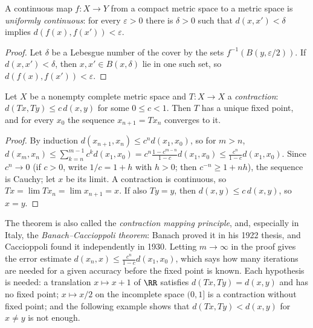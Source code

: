 \begin{corollary}\label{general-topology:corollary-uniform-continuity}
A continuous map $f \colon X \to Y$ from a compact metric space to a metric space is \emph{uniformly continuous}: for every $\varepsilon > 0$ there is
$\delta > 0$ such that $d(x, x') < \delta$ implies $d(f(x), f(x')) < \varepsilon$.
\end{corollary}

\begin{proof}
Let $\delta$ be a Lebesgue number of the cover by the sets $f^{-1}(B(y, \varepsilon/2))$. If $d(x, x') < \delta$, then $x, x' \in B(x, \delta)$ lie in one such
set, so $d(f(x), f(x')) < \varepsilon$.
\end{proof}

\begin{theorem}\label{general-topology:theorem-banach-fixed-point}
Let $X$ be a nonempty complete metric space and $T \colon X \to X$ a \emph{contraction}: $d(Tx, Ty) \leq c\,d(x, y)$ for some $0 \leq c < 1$. Then $T$ has a
unique fixed point, and for every $x_0$ the sequence $x_{n+1} = Tx_n$ converges to it.
\end{theorem}

\begin{proof}
By induction $d(x_{n+1}, x_n) \leq c^n d(x_1, x_0)$, so for $m > n$,
$d(x_m, x_n) \leq \sum_{k=n}^{m-1} c^k d(x_1, x_0) = c^n\frac{1 - c^{m-n}}{1 - c}d(x_1, x_0) \leq \frac{c^n}{1 - c}d(x_1, x_0)$. Since $c^n \to 0$ (if
$c > 0$, write $1/c = 1 + h$ with $h > 0$; then $c^{-n} \geq 1 + nh$), the sequence is Cauchy; let $x$ be its limit. A contraction is continuous, so
$Tx = \lim Tx_n = \lim x_{n+1} = x$. If also $Ty = y$, then $d(x, y) \leq c\,d(x, y)$, so $x = y$.
\end{proof}

The theorem is also called the \emph{contraction mapping principle}, and, especially in Italy, the \emph{Banach--Caccioppoli theorem}: Banach proved it in his 1922 thesis, and Caccioppoli found it
independently in 1930. Letting $m \to \infty$ in the proof gives the error estimate $d(x_n, x) \leq \frac{c^n}{1 - c}d(x_1, x_0)$, which says how many iterations are needed for a given accuracy
before the fixed point is known. Each hypothesis is needed: a translation $x \mapsto x + 1$ of $\RR$ satisfies $d(Tx, Ty) = d(x, y)$ and has no fixed point; $x \mapsto x/2$ on the incomplete space
$(0, 1]$ is a contraction without fixed point; and the following example shows that $d(Tx, Ty) < d(x, y)$ for $x \neq y$ is not enough.

